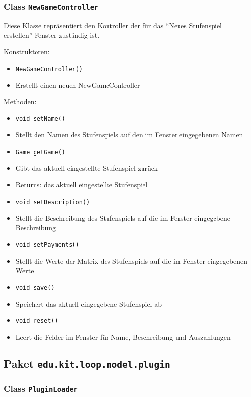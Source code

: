 \documentclass[parskip=full,11pt]{scrartcl}
\begin{document}
\subsubsection{Class \texttt{NewGameController}}
Diese Klasse repräsentiert den Kontroller der für das \enquote{Neues Stufenspiel erstellen}-Fenster zuständig ist.

Konstruktoren:
\begin{itemize}\itemsep -10pt
\item \texttt{NewGameController()}
\item[] Erstellt einen neuen NewGameController
\end{itemize}

Methoden:
\begin{itemize}\itemsep -10pt
\item \texttt{void setName()}
\item[] Stellt den Namen des Stufenspiels auf den im Fenster eingegebenen Namen


\item \texttt{Game getGame()}
\item[] Gibt das aktuell eingestellte Stufenspiel zurück
\item[] Returns: das aktuell eingestellte Stufenspiel

\item \texttt{void setDescription()}
\item[] Stellt die Beschreibung des Stufenspiels auf die im Fenster eingegebene Beschreibung

\item \texttt{void setPayments()}
\item[] Stellt die Werte der Matrix des Stufenspiels auf die im Fenster eingegebenen Werte

\item\texttt{void save()}
\item[] Speichert das aktuell eingegebene Stufenspiel ab

\item \texttt{void reset()}
\item[] Leert die Felder im Fenster für Name, Beschreibung und Auszahlungen

\end{itemize}

\subsection{Paket \texttt{edu.kit.loop.model.plugin}}

\subsubsection{Class \texttt{PluginLoader}}
\end{document}
